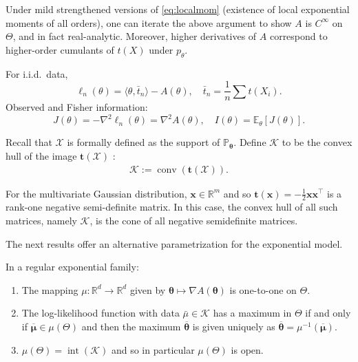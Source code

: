 \begin{remark}
Under mild strengthened versions of \eqref{eq:localmom} (existence of local exponential moments of all orders),
one can iterate the above argument to show $A$ is $C^\infty$ on $\Theta$, and in fact real-analytic.
Moreover, higher derivatives of $A$ correspond to higher-order cumulants of $t(X)$ under $p_\theta$.
\end{remark}

\begin{remark}
    For i.i.d.\ data,
\[
\ell_n(\theta)=\langle \theta,\bar t_n\rangle - A(\theta),
\quad
\bar t_n=\frac{1}{n}\sum t(X_i).
\]
Observed and Fisher information:
\[
J(\theta)=-\nabla^2\ell_n(\theta)=\nabla^2A(\theta),
\quad
I(\theta)=\mathbb{E}_\theta[J(\theta)].
\]
\end{remark}

Recall that $\mathcal{X}$ is formally defined as the support of $\mathbb{P}_{\boldsymbol{\theta}}$. Define $\mathcal{K}$ to be the convex hull of the image $\mathbf{t}(\mathcal{X})$ :
\begin{align*}
\mathcal{K}:=\operatorname{conv}(\mathbf{t}(\mathcal{X})) .
\end{align*}

\begin{eg}
    For the multivariate Gaussian distribution, $\mathbf{x} \in \mathbb{R}^m$ and so $\mathbf{t}(\mathbf{x})=-\frac{1}{2} \mathbf{x} \mathbf{x}^{\top}$ is a rank-one negative semi-definite matrix. In this case, the convex hull of all such matrices, namely $\mathcal{K}$, is the cone of all negative semidefinite matrices.
\end{eg}


The next results offer an alternative parametrization for the exponential model.

\begin{prop}
    In a regular exponential family:
    \begin{enumerate}
        \item The mapping $\mu: \mathbb{R}^d \rightarrow \mathbb{R}^d$ given by $\boldsymbol{\theta} \mapsto \nabla A(\boldsymbol{\theta})$ is one-to-one on $\Theta$.
        \item The log-likelihood function with data $\bar{\mu} \in \mathcal{K}$ has a maximum in $\Theta$ if and only if $\overline{\boldsymbol{\mu}} \in \mu(\Theta)$ and then the maximum $\overline{\boldsymbol{\theta}}$ is given uniquely as $\overline{\boldsymbol{\theta}}=\mu^{-1}(\overline{\boldsymbol{\mu}})$.
        \item $\mu(\Theta)=\operatorname{int}(\mathcal{K})$ and so in particular $\mu(\Theta)$ is open.
    \end{enumerate}
\end{prop}

